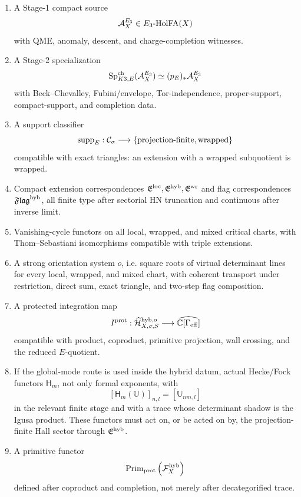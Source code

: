 \begin{enumerate}
\item A Stage-1 compact source
\[
        \mathcal A_X^{E_3}\in E_3\hbox{-}\mathrm{HolFA}(X)
\]
with QME, anomaly, descent, and charge-completion witnesses.

\item A Stage-2 specialization
\[
        \mathrm{Sp}^{\mathrm{ch}}_{K3,E}(\mathcal A_X^{E_3})
        \simeq (p_E)_*\mathcal A_X^{E_3}
\]
with Beck--Chevalley, Fubini/envelope, Tor-independence,
proper-support, compact-support, and completion data.

\item A support classifier
\[
        \operatorname{supp}_E:\mathcal C_\sigma
        \longrightarrow
        \{\hbox{projection-finite},\hbox{wrapped}\}
\]
compatible with exact triangles: an extension with a wrapped subquotient
is wrapped.

\item Compact extension correspondences \(\mathfrak E^{\mathrm{loc}},\mathfrak E^{\mathrm{hyb}},\mathfrak E^{\mathrm{wr}}\) and flag
correspondences \(\mathfrak{Flag}^{\mathrm{hyb}}\), all finite type after sectorial HN
truncation and continuous after inverse limit.

\item Vanishing-cycle functors on all local, wrapped, and mixed critical
charts, with Thom--Sebastiani isomorphisms compatible with triple
extensions.

\item A strong orientation system \(o\), i.e. square roots of virtual
determinant lines for every local, wrapped, and mixed chart, with
coherent transport under restriction, direct sum, exact triangle, and
two-step flag composition.

\item A protected integration map
\[
        I^{\mathrm{prot}}:
        \widehat{\mathcal H}^{\mathrm{hyb},o}_{X,\sigma,S}
        \longrightarrow
        \widehat{\mathbb C[\Gamma_{\mathrm{eff}}]}
\]
compatible with product, coproduct, primitive projection, wall crossing,
and the reduced \(E\)-quotient.

\item If the global-mode route is used inside the hybrid datum, actual
Hecke/Fock functors \(\mathsf H_m\), not only formal exponents, with
\[
        [\mathsf H_m(\mathbb U)]_{n,l}=[\mathbb U_{nm,l}]
\]
in the relevant finite stage and with a trace whose determinant shadow is
the Igusa product.  These functors must act on, or be acted on by, the
projection-finite Hall sector through \(\mathfrak E^{\mathrm{hyb}}\).

\item A primitive functor
\[
        \operatorname{Prim}_{\mathrm{prot}}
        \left(\mathcal F_X^{\mathrm{hyb}}\right)
\]
defined after coproduct and completion, not merely after decategorified
trace.
\end{enumerate}

